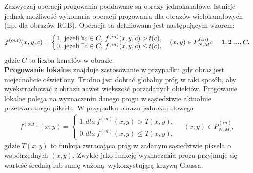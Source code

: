 Zazwyczaj operacji progowania poddawane są obrazy jednokanałowe. Istnieje jednak możliwość wykonania operacji progowania dla obrazów wielokanałowych (np. dla obrazów RGB). Operacja ta definiowana jest następującym wzorem:
\begin{gather*}
  f^{(out)}(x, y, c) = \left\{\begin{matrix}
  1, \; \text{jeżeli} \; \forall c \in C, \; f^{(in)}(x, y, c) > t(c),\\
  0, \; \text{jeżeli} \; \exists c \in C, \; f^{(in)}(x, y, c) \leq t(c),
  \end{matrix}\right. \quad (x, y) \in P^{(in)}_{N,M} \space c=1,2,...,C,
\end{gather*}
gdzie $C$ to liczba kanałów w obrazie. \\

\textbf{Progowanie lokalne} znajduje zastosowanie w przypadku gdy obraz jest niejednolicie oświetlony. Trudno jest dobrać globalny próg w taki sposób, aby wyekstrachować z obrazu nawet większość porządanych obiektów. Progowanie lokalne polega na wyznaczeniu danego progu w sąsiedztwie aktualnie przetwarzanego piksela. W przypadku obrazu jednokanałowego
\begin{gather*}
  f^{(out)}(x, y) = \left\{\begin{matrix}
  1, dla \: f^{(in)}(x, y) > T(x, y),\\
  0, dla \: f^{(in)}(x, y) \leq T(x, y),
  \end{matrix}\right. \quad (x, y) \in P^{(in)}_{N,M},
\end{gather*}
gdzie $T(x, y)$ to funkcja zwracająca próg w zadanym sąsiedztwie piksela o współrzędnych $(x, y)$. Zwykle jako funkcję wyznaczania progu przyjmuje się wartość średnią lub sumę ważoną, wykorzystującą krzywą Gaussa.

